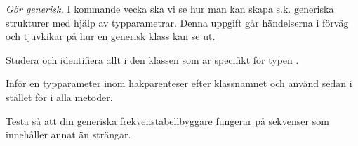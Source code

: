 \Task \emph{Gör  generisk.} I kommande vecka ska vi se hur man kan skapa s.k. generiska strukturer med hjälp av typparametrar. Denna uppgift går händelserna i förväg och tjuvkikar på hur en generisk klass kan se ut. 

\Subtask Studera  och identifiera allt i den klassen som är specifikt för typen . 

\Subtask Inför en typparameter  inom hakparenteser efter klassnamnet och använd sedan  i stället för  i alla metoder. 

\Subtask Testa så att din generiska frekvenstabellbyggare fungerar på sekvenser som innehåller annat än strängar.












